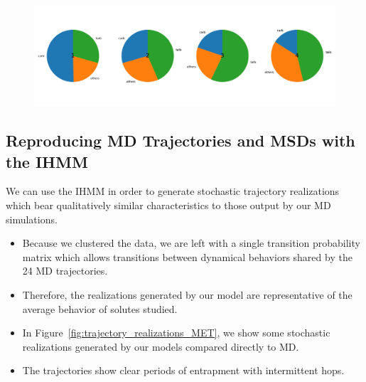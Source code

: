 \documentclass{article}
\begin{document}
  \begin{figure}
  \centering
  \includegraphics[width=\textwidth]{hbond_pi_charts.pdf}
  \caption{}\label{fig:hbond_pichart}
  \end{figure}
    
  \subsection{Reproducing MD Trajectories and MSDs with the IHMM}
  
  We can use the IHMM in order to generate stochastic trajectory realizations
  which bear qualitatively similar characteristics to those output
  by our MD simulations.
  \begin{itemize}
    \item Because we clustered the data, we are left with a single transition
    probability matrix which allows transitions between dynamical behaviors
    shared by the 24 MD trajectories.
    \item Therefore, the realizations generated by our model are representative
    of the average behavior of solutes studied.
    \item In Figure~\ref{fig:trajectory_realizations_MET}, we show some stochastic
    realizations generated by our models compared directly to MD.
    \item The trajectories show clear periods of entrapment with intermittent hops.
  \end{itemize}
  
\end{document}
